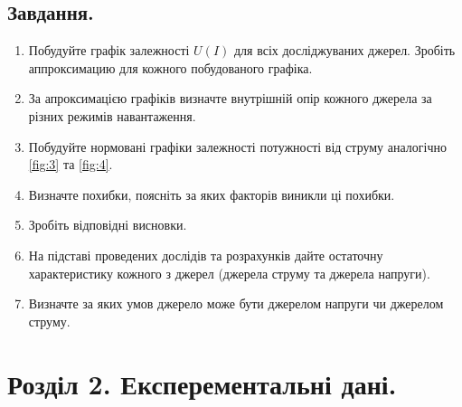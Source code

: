 \documentclass[a4paper,12pt]{article}
\begin{document}
\begin{justify}
	\subsection{Завдання.}
	\begin{enumerate}
		\item Побудуйте графік залежності $U(I)$ для всіх досліджуваних джерел. Зробіть аппроксимацию для кожного побудованого графіка.
		\item За апроксимацією графіків визначте внутрішній опір кожного джерела за різних режимів навантаження.
		\item Побудуйте нормовані графіки залежності потужності від струму аналогічно \ref{fig:3} та \ref{fig:4}.
		\item Визначте похибки, поясніть за яких факторів виникли ці похибки.
		\item Зробіть відповідні висновки.
		\item На підставі проведених дослідів та розрахунків дайте остаточну характеристику кожного з джерел (джерела струму та джерела напруги).
		\item Визначте за яких умов джерело може бути джерелом напруги чи джерелом струму.
	\end{enumerate}
	\newpage
	\section{Розділ 2. Експерементальні дані.}

\end{justify}
\end{document}
